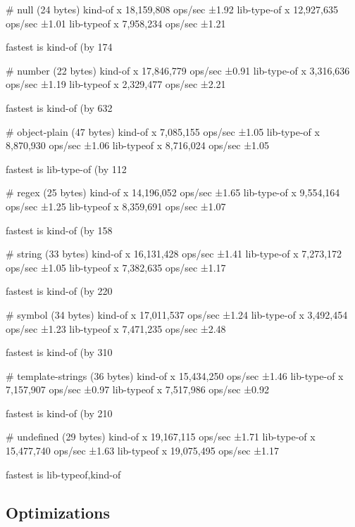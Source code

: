 \begin{DoxyCode}
# null (24 bytes)
  kind-of x 18,159,808 ops/sec ±1.92%
  lib-type-of x 12,927,635 ops/sec ±1.01%
  lib-typeof x 7,958,234 ops/sec ±1.21%

  fastest is kind-of (by 174%

# number (22 bytes)
  kind-of x 17,846,779 ops/sec ±0.91%
  lib-type-of x 3,316,636 ops/sec ±1.19%
  lib-typeof x 2,329,477 ops/sec ±2.21%

  fastest is kind-of (by 632%

# object-plain (47 bytes)
  kind-of x 7,085,155 ops/sec ±1.05%
  lib-type-of x 8,870,930 ops/sec ±1.06%
  lib-typeof x 8,716,024 ops/sec ±1.05%

  fastest is lib-type-of (by 112%

# regex (25 bytes)
  kind-of x 14,196,052 ops/sec ±1.65%
  lib-type-of x 9,554,164 ops/sec ±1.25%
  lib-typeof x 8,359,691 ops/sec ±1.07%

  fastest is kind-of (by 158%

# string (33 bytes)
  kind-of x 16,131,428 ops/sec ±1.41%
  lib-type-of x 7,273,172 ops/sec ±1.05%
  lib-typeof x 7,382,635 ops/sec ±1.17%

  fastest is kind-of (by 220%

# symbol (34 bytes)
  kind-of x 17,011,537 ops/sec ±1.24%
  lib-type-of x 3,492,454 ops/sec ±1.23%
  lib-typeof x 7,471,235 ops/sec ±2.48%

  fastest is kind-of (by 310%

# template-strings (36 bytes)
  kind-of x 15,434,250 ops/sec ±1.46%
  lib-type-of x 7,157,907 ops/sec ±0.97%
  lib-typeof x 7,517,986 ops/sec ±0.92%

  fastest is kind-of (by 210%

# undefined (29 bytes)
  kind-of x 19,167,115 ops/sec ±1.71%
  lib-type-of x 15,477,740 ops/sec ±1.63%
  lib-typeof x 19,075,495 ops/sec ±1.17%

  fastest is lib-typeof,kind-of
\end{DoxyCode}


\subsection*{Optimizations}

